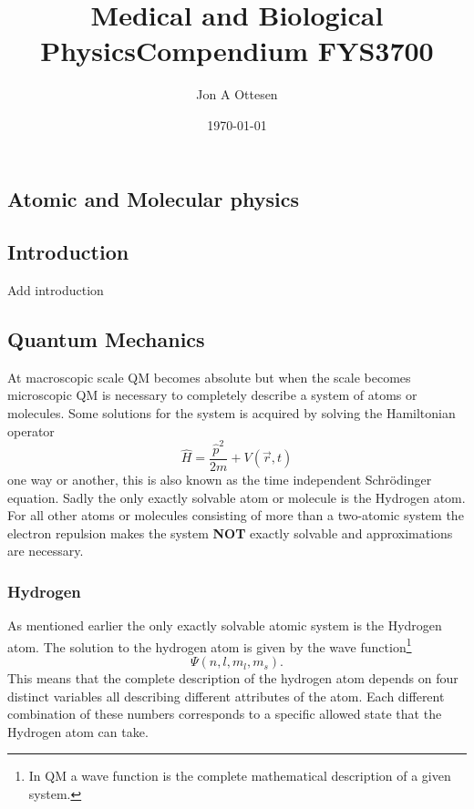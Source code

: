 \documentclass[jmp, amsmath, amssymb, reprint]{article}
\numberwithin{equation}{section}
\newcommand{\lp}{\left(}
\newcommand{\rp}{\right)}
\begin{document}
\title{Medical and Biological Physics}

\author{Jon A Ottesen}
\title{Compendium FYS3700}%
\date{\today}
\maketitle

\newpage
\tableofcontents
\newpage

\begin{multicols}{2}

\section{Atomic and Molecular physics}

\subsection*{Introduction}

Add introduction

\subsection{Quantum Mechanics}

At macroscopic scale QM becomes absolute but when the scale becomes microscopic QM is necessary to completely describe a system of atoms or molecules. Some solutions for the system is acquired by solving the Hamiltonian operator
\begin{equation}
 \hat{H} = \frac{\hat{p}^2}{2m} + V(\vec{r},t)
\end{equation}
one way or another, this is also known as the time independent Schrödinger equation. Sadly the only exactly solvable atom or molecule is the Hydrogen atom. For all other atoms or molecules consisting of more than a two-atomic system the electron repulsion makes the system \textbf{NOT} exactly solvable and approximations are necessary.

\subsubsection{Hydrogen}

As mentioned earlier the only exactly solvable atomic system is the Hydrogen atom. The solution to the hydrogen atom is given by the wave function\footnote{In QM a wave function is the complete mathematical description of a given system.}
\begin{equation}\label{eq:01}
\Psi\lp n,l,m_l, m_s\rp.
\end{equation}
This means that the complete description of the hydrogen atom depends on four distinct variables all describing different attributes of the atom. Each different combination of these numbers corresponds to a specific allowed state that the Hydrogen atom can take.


\end{multicols}
\end{document}
